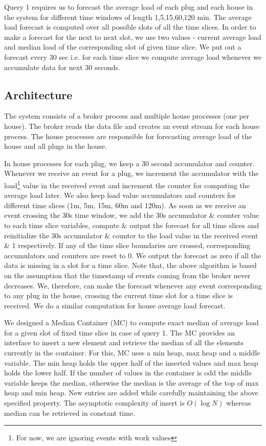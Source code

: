 Query 1 requires us to forecast the average load of each plug and each house in the system for different time windows of length 1,5,15,60,120 min. The average load forecast is computed over all possible slots of all the time slices. In order to make a forecast for the next to next slot, we use two values - current average load and median load of the corresponding slot of given time slice. We put out a forecast every 30 sec i.e. for each time slice we compute average load whenever we accumulate data for next 30 seconds.

\subsection{Architecture}
The system consists of a broker process and multiple house processes (one per house). The broker reads the data file and creates an event stream for each house process. The house processes are responsible for forecasting average load of the house and all plugs in the house.

In house processes for each plug, we keep a 30 second accumulator and counter. Whenever we receive an event for a plug, we increment the accumulator with the load\footnote{For now, we are ignoring events with work values} value in the received event and increment the counter for computing the average load later. We also keep load value accumulators and counters for different time slices (1m, 5m, 15m, 60m and 120m). As soon as we receive an event crossing the 30s time window, we add the 30s accumulator \& counter value to each time slice variables, compute \& output the forecast for all time slices and reinitialize the 30s accumulator \& counter to the load value in the received event \& 1 respectively. If any of the time slice boundaries are crossed, corresponding accumulators and counters are reset to 0. We output the forecast as zero if all the data is missing in a slot for a time slice. Note that, the above algorithm is based on the assumption that the timestamp of events coming from the broker never decreases. We, therefore, can make the forecast whenever any event corresponding to any plug in the house, crossing the current time slot for a time slice is received. We do a similar computation for house average load forecast.

We designed a Median Container (MC) to compute exact median of average load for a given slot of fixed time slice in case of query 1. The MC provides an interface to insert a new element and retrieve the median of all the elements currently in the container. For this, MC uses a min heap, max heap and a middle variable. The min heap holds the upper half of the inserted values and max heap holds the lower half. If the number of values in the container is odd the middle variable keeps the median, otherwise the median is the average of the top of max heap and min heap. New entries are added while carefully maintaining the above specified property. The asymptotic complexity of insert is $O(\log N)$ whereas median can be retrieved in constant time.

